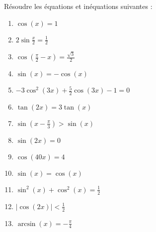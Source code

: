 

\begin{exercice}\label{exoINGE11140025}

	Résoudre les équations et inéquations suivantes :
	\begin{enumerate}

		\item
			$\cos(x)=1$
		\item
			$2\sin\frac{ x }{2}=\frac{1}{ 2 }$
		\item
			$\cos(\frac{ \pi }{2}-x)=\frac{ \sqrt{3} }{2}$
		\item
			$\sin(x)=-\cos(x)$
		\item
			$-3\cos^2(3x)+\frac{ 5 }{2}\cos(3x)-1=0$
		\item
			$\tan(2x)=3\tan(x)$
		\item
			$\sin(x-\frac{ \pi }{ 3 })>\sin(x)$
		\item
			$\sin(2x)=0$
		\item
			$\cos(40x)=4$
		\item
			$\sin(x)=\cos(x)$
		\item
			$\sin^2(x)+\cos^2(x)=\frac{1}{ 2 }$
		\item
			$| \cos(2x) |<\frac{1}{ 2 }$
		\item
			$\arcsin(x)=-\frac{ \pi }{ 4 }$

	\end{enumerate}

\end{exercice}
